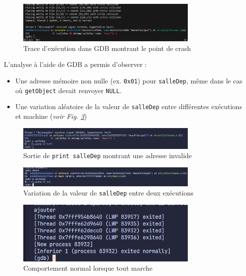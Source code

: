 \documentclass[a4paper,11pt]{article}
\begin{document}
\begin{figure}[ht]
\centering
\includegraphics[width=0.8\textwidth]{./img/gdbSIGEGV.png}
\caption{Trace d'exécution dans GDB montrant le point de crash}
\label{fig:gdbSIGEGV}
\end{figure}

\newpage
L'analyse à l'aide de GDB a permis d'observer : 
\begin{itemize} 
    \item Une adresse mémoire non nulle (ex. \texttt{0x01}) pour \texttt{salleDep}, même dans le cas où \texttt{getObject} devait renvoyer \texttt{NULL}. 
    \item Une variation aléatoire de la valeur de \texttt{salleDep} entre différentes exécutions et machine (\textit{voir Fig. \ref{fig:gdb0x1}})
\end{itemize}

\begin{figure}[ht]
\centering
\includegraphics[width=0.8\textwidth]{./img/gdb0xf0.png}
\caption{Sortie de \texttt{print salleDep} montrant une adresse invalide}
\label{fig:gdb0xf0}
\end{figure}

\begin{figure}[ht]
\centering
\includegraphics[width=0.8\textwidth]{./img/gdb0x1.png}
\caption{Variation de la valeur de \texttt{salleDep} entre deux exécutions}
\label{fig:gdb0x1}
\end{figure}

\begin{figure}[ht]
\centering
\includegraphics[width=0.8\textwidth]{./img/gdbNoError.png}
\caption{Comportement normal lorsque tout marche}
\label{fig:gdbNoError}
\end{figure}
\end{document}
